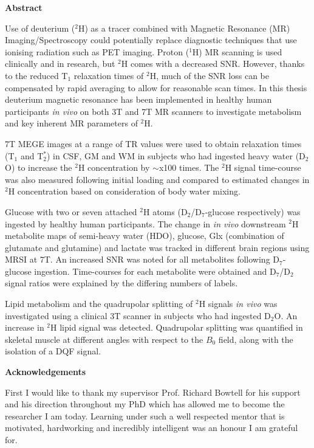 \documentclass[12pt]{report}
\begin{document}
\newpage
\thispagestyle{plain}
\setcounter{page}{1}
\begin{center}
    \textbf{Abstract}
\end{center}
Use of deuterium ($^2$H) as a tracer combined with Magnetic Resonance (MR) Imaging/Spectroscopy could potentially replace diagnostic techniques that use ionising radiation such as \ac{PET} imaging. Proton ($^1$H) MR scanning is used clinically and in research, but $^2$H comes with a decreased \ac{SNR}. However, thanks to the reduced T$_1$ relaxation times of $^2$H, much of the \ac{SNR} loss can be compensated by rapid averaging to allow for reasonable scan times. In this thesis deuterium magnetic resonance has been implemented in healthy human participants \textit{in vivo} on both 3T and 7T MR scanners to investigate metabolism and key inherent MR parameters of $^2$H.

7T \ac{MEGE} images at a range of \ac{TR} values were used to obtain relaxation times (T$_1$ and T$_2^*$) in \ac{CSF}, \ac{GM} and \ac{WM} in subjects who had ingested heavy water (D$_2$O) to increase the $^2$H concentration by $\sim$x100 times. The $^2$H signal time-course was also measured following initial loading and compared to estimated changes in $^2$H concentration based on consideration of body water mixing.

Glucose with two or seven attached $^2$H atoms (D$_2$/D$_7$-glucose respectively) was ingested by healthy human participants. The change in \textit{in vivo} downstream $^2$H metabolite maps of semi-heavy water (HDO), glucose, Glx (combination of glutamate and glutamine) and lactate was tracked in different brain regions using \ac{MRSI} at 7T. An increased \ac{SNR} was noted for all metabolites following D$_7$-glucose ingestion. Time-courses for each metabolite were obtained and D$_7$/D$_2$ signal ratios were explained by the differing numbers of labels.

Lipid metabolism and the quadrupolar splitting of $^2$H signals \textit{in vivo} was investigated using a clinical 3T scanner in subjects who had ingested D$_2$O. An increase in $^2$H lipid signal was detected. Quadrupolar splitting was quantified in skeletal muscle at different angles with respect to the $B_0$ field, along with the isolation of a \ac{DQF} signal.

\newpage
\vspace*{\fill}

\newpage
\thispagestyle{plain}
\begin{center}
    \textbf{Acknowledgements}
\end{center}
First I would like to thank my supervisor Prof. Richard Bowtell for his support and his direction throughout my PhD which has allowed me to become the researcher I am today. Learning under such a well respected mentor that is motivated, hardworking and incredibly intelligent was an honour I am grateful for. 
\end{document}
